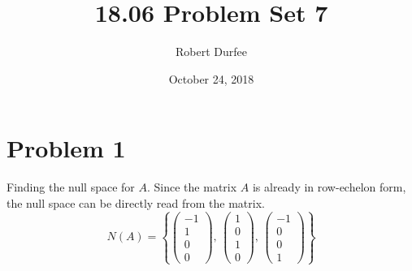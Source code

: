 \documentclass{article}
\title{18.06 Problem Set 7}
\author{Robert Durfee}
\date{October 24, 2018}
\begin{document}
\maketitle

\section*{Problem 1}

Finding the null space for $A$. Since the matrix $A$ is already in
row-echelon form, the null space can be directly read from the matrix.
$$ N(A) = \left\{ \begin{pmatrix}
    -1 \\
    1 \\
    0 \\
    0
\end{pmatrix},\, \begin{pmatrix}
    1 \\
    0 \\
    1 \\
    0
\end{pmatrix},\, \begin{pmatrix}
    -1 \\
    0 \\
    0 \\
    1
\end{pmatrix} \right\} $$
\end{document}
